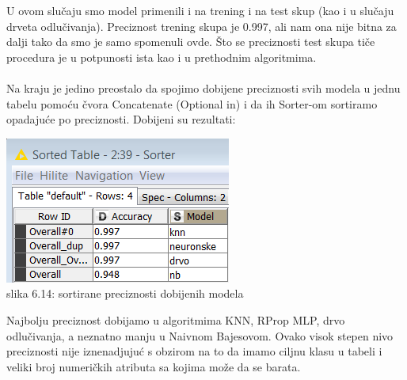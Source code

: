 \documentclass[10pt]{article}
\begin{document}
U ovom slu\v caju smo model primenili i na trening i na test skup (kao i u slu\v caju drveta odlu\v civanja). Preciznost trening skupa je 0.997, ali nam ona nije bitna za dalji tako da smo je samo spomenuli ovde. \v Sto se preciznosti test skupa ti\v ce procedura je u potpunosti ista kao i u prethodnim algoritmima.\\~\\

Na kraju je jedino preostalo da spojimo dobijene preciznosti svih modela u jednu tabelu pomo\' cu \v cvora Concatenate (Optional in) i da ih Sorter-om sortiramo opadaju\' ce po preciznosti. Dobijeni su rezultati:

\begin{center}
\includegraphics[scale = 0.75]{Finale}\\
slika 6.14: sortirane preciznosti dobijenih modela\\
\end{center}

Najbolju preciznost dobijamo u algoritmima KNN, RProp MLP, drvo odlu\v civanja, a neznatno manju u Naivnom Bajesovom. Ovako visok stepen nivo preciznosti nije iznenadjuju\' c s obzirom na to da imamo ciljnu klasu u tabeli i veliki broj numeri\v ckih atributa sa kojima mo\v ze da se barata. 
\end{document}
